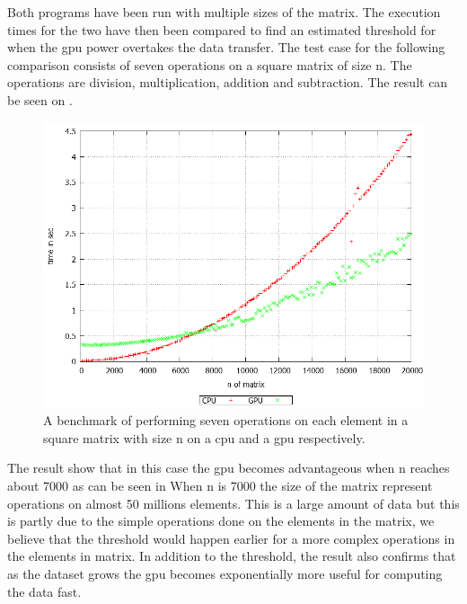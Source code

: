 Both programs have been run with multiple sizes of the matrix.
The execution times for the two have then been compared to find an estimated threshold for when the \acrshort{gpu} power overtakes the data transfer.
The test case for the following comparison consists of seven operations on a square matrix of size n.
The operations are division, multiplication, addition and subtraction.
The result can be seen on .
\begin{figure}[h!]
\centering
 \includegraphics[width=1\textwidth]{figures/benchmark.png} %
\caption{A benchmark of performing seven operations on each element in a square matrix with size n on a \acrshort{cpu} and a \acrshort{gpu} respectively.}\label{image:benchmark}
\vspace{-15pt}
\end{figure}

The result show that in this case the \acrshort{gpu} becomes advantageous when n reaches about 7000 as can be seen in 
When n is 7000 the size of the matrix represent operations on almost 50 millions elements.
This is a large amount of data but this is partly due to the simple operations done on the elements in the matrix, we believe that the threshold would happen earlier for a more complex operations in the elements in matrix.
In addition to the threshold, the result also confirms that as the dataset grows the \acrshort{gpu} becomes exponentially more useful for computing the data fast.
